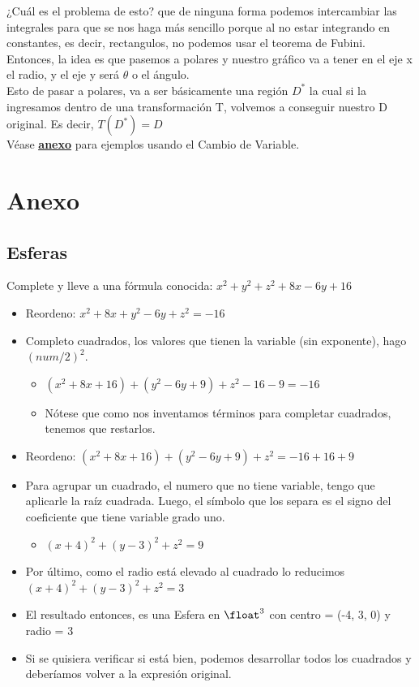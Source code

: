 \documentclass[10pt,a4paper]{article}
\begin{document}
¿Cuál es el problema de esto? que de ninguna forma podemos intercambiar las integrales para que se nos haga más sencillo porque al no estar integrando en constantes, es decir, rectangulos, no podemos usar el teorema de Fubini. \\
Entonces, la idea es que pasemos a polares y nuestro gráfico va a tener en el eje x el radio, y el eje y será $\theta$ o el ángulo. \\
Esto de pasar a polares, va a ser básicamente una región $D^{*}$ la cual si la ingresamos dentro de una transformación T, volvemos a conseguir nuestro D original. Es decir, $T(D^{*}) = D$ \\
Véase \hyperref[subsec:cambio_variable]{\textbf{\underline{anexo}}} para ejemplos usando el Cambio de Variable.

\section*{Anexo}
\subsection*{Esferas}
\label{subsec:completar_cuadrados_esfera}
Complete y lleve a una fórmula conocida: $x^{2} + y^{2} + z^{2} + 8x - 6y + 16$ 
\begin{itemize}
    \item Reordeno: $x^{2} + 8x + y^{2} - 6y +z^{2} = -16$ 
    \item Completo cuadrados, los valores que tienen la variable (sin exponente), hago $(num/2)^{2}$.
    \begin{itemize}
        \item $(x^{2} + 8x + 16) + (y^{2} - 6y + 9) + z^{2} - 16 - 9 = -16$
        \item Nótese que como nos inventamos términos para completar cuadrados, tenemos que restarlos.
    \end{itemize}
    \item Reordeno: $(x^{2} + 8x + 16) + (y^{2} - 6y + 9) + z^{2} = -16 + 16 + 9$
    \item Para agrupar un cuadrado, el numero que no tiene variable, tengo que aplicarle la raíz cuadrada. Luego, el símbolo que los separa es el signo del coeficiente que tiene variable grado uno.
    \begin{itemize}
        \item $(x+4)^{2} + (y-3)^{2} + z^{2} = 9$
    \end{itemize}
    \item Por último, como el radio está elevado al cuadrado lo reducimos $(x+4)^{2} + (y-3)^{2} + z^{2} = 3$
    \item El resultado entonces, es una Esfera en $\float^{3}$ con centro = (-4, 3, 0) y radio = 3
    \item Si se quisiera verificar si está bien, podemos desarrollar todos los cuadrados y deberíamos volver a la expresión original.
\end{itemize}
\end{document}
